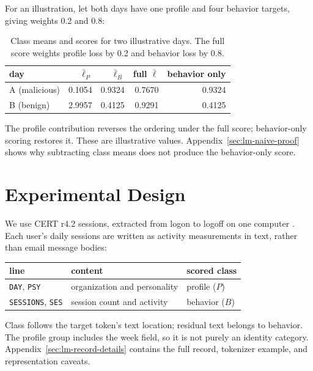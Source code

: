 \documentclass[12pt]{report}
\begin{document}
For an illustration, let both days have one profile and four behavior
targets, giving weights 0.2 and 0.8:
\begin{table}[H]
\centering
\caption[An illustrative profile--behavior ranking change]{Class means and
scores for two illustrative days. The full score weights profile loss by
0.2 and behavior loss by 0.8.}
\label{tab:lm-example}
\begin{tabular}{lrrrr}
\toprule
day & $\bar\ell_P$ & $\bar\ell_B$ & full $\bar\ell$ & behavior only \\
\midrule
A (malicious) & 0.1054 & 0.9324 & 0.7670 & 0.9324 \\
B (benign) & 2.9957 & 0.4125 & 0.9291 & 0.4125 \\
\bottomrule
\end{tabular}
\end{table}
The profile contribution reverses the ordering under the full score;
behavior-only scoring restores it. These are illustrative values.
Appendix~\ref{sec:lm-naive-proof} shows why subtracting class means
does not produce the behavior-only score.

\section{Experimental Design}
\label{sec:lm-data}
\label{sec:design}
We use CERT r4.2 sessions, extracted from logon to logoff on one computer
\cite{le2020analyzing}. Each user's daily sessions are written as activity
measurements in text, rather than email message bodies:
\begin{center}
\begin{tabular}{lll}
\toprule
line & content & scored class \\
\midrule
\texttt{DAY}, \texttt{PSY} & organization and personality & profile ($P$) \\
\texttt{SESSIONS}, \texttt{SES} & session count and activity & behavior ($B$) \\
\bottomrule
\end{tabular}
\end{center}
Class follows the target token's text location; residual text belongs
to behavior. The profile group includes the week field, so it is not
purely an identity category. Appendix~\ref{sec:lm-record-details}
contains the full record, tokenizer example, and representation caveats.
\end{document}
